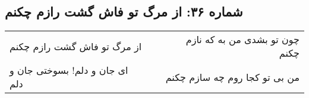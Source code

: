 \begin{center}
\section*{شماره ۳۶: از مرگ تو فاش گشت رازم چکنم}
\label{sec:036}
\begin{longtable}{l p{0.5cm} r}
از مرگ تو فاش گشت رازم چکنم
&&
چون تو بشدی من به که نازم چکنم
\\
ای جان و دلم! بسوختی جان و دلم
&&
من بی تو کجا روم چه سازم چکنم
\\
\end{longtable}
\end{center}
